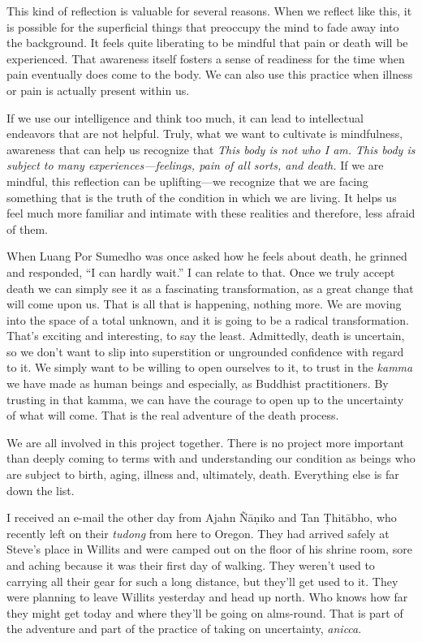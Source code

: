 This kind of reflection is valuable for several reasons. When we 
reflect like this, it is possible for the superficial things that 
preoccupy the mind to fade away into the background. It feels quite 
liberating to be mindful that pain or death will be experienced. That 
awareness itself fosters a sense of readiness for the time when pain 
eventually does come to the body. We can also use this practice when 
illness or pain is actually present within us.

If we use our intelligence and think too much, it can lead to 
intellectual endeavors that are not helpful. Truly, what we want to 
cultivate is mindfulness, awareness that can help us recognize that 
\emph{This body is not who I am. This body is subject to many 
experiences---feelings, pain of all sorts, and death.} If we are 
mindful, this reflection can be uplifting---we recognize that we are 
facing something that is the truth of the condition in which we are 
living. It helps us feel much more familiar and intimate with these 
realities and therefore, less afraid of them.

When Luang Por Sumedho was once asked how he feels about death, he 
grinned and responded, ``I can hardly wait.'' I can relate to that. 
Once we truly accept death we can simply see it as a fascinating 
transformation, as a great change that will come upon us. That is all 
that is happening, nothing more. We are moving into the space of a 
total unknown, and it is going to be a radical transformation. That's 
exciting and interesting, to say the least. Admittedly, death is 
uncertain, so we don't want to slip into superstition or ungrounded 
confidence with regard to it. We simply want to be willing to open 
ourselves to it, to trust in the \emph{kamma} we have made as human 
beings and especially, as Buddhist practitioners. By trusting in that 
kamma, we can have the courage to open up to the uncertainty of what 
will come. That is the real adventure of the death process.

We are all involved in this project together. There is no project more 
important than deeply coming to terms with and understanding our 
condition as beings who are subject to birth, aging, illness and, 
ultimately, death. Everything else is far down the list.


I received an e-mail the other day from Ajahn Ñāṇiko and Tan 
Ṭhitābho, who recently left on their \emph{tudong} from here to 
Oregon. They had arrived safely at Steve's place in Willits and were 
camped out on the floor of his shrine room, sore and aching because it 
was their first day of walking. They weren't used to carrying all their 
gear for such a long distance, but they'll get used to it. They were 
planning to leave Willits yesterday and head up north. Who knows how 
far they might get today and where they'll be going on alms-round. That 
is part of the adventure and part of the practice of taking on 
uncertainty, \emph{anicca}.

